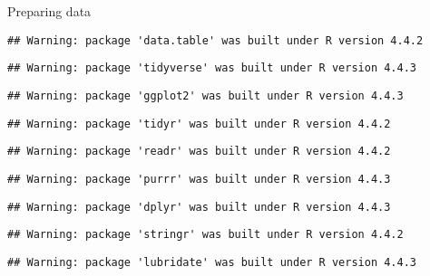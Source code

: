 \documentclass[
  ignorenonframetext,
]{beamer}
\begin{document}
\begin{frame}[fragile]{Preparing data}
\label{preparing-data}
\begin{verbatim}
## Warning: package 'data.table' was built under R version 4.4.2
\end{verbatim}

\begin{verbatim}
## Warning: package 'tidyverse' was built under R version 4.4.3
\end{verbatim}

\begin{verbatim}
## Warning: package 'ggplot2' was built under R version 4.4.3
\end{verbatim}

\begin{verbatim}
## Warning: package 'tidyr' was built under R version 4.4.2
\end{verbatim}

\begin{verbatim}
## Warning: package 'readr' was built under R version 4.4.2
\end{verbatim}

\begin{verbatim}
## Warning: package 'purrr' was built under R version 4.4.3
\end{verbatim}

\begin{verbatim}
## Warning: package 'dplyr' was built under R version 4.4.3
\end{verbatim}

\begin{verbatim}
## Warning: package 'stringr' was built under R version 4.4.2
\end{verbatim}

\begin{verbatim}
## Warning: package 'lubridate' was built under R version 4.4.3
\end{verbatim}


\end{frame}
\end{document}
